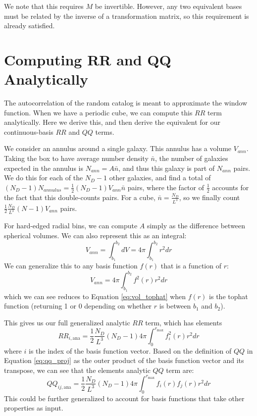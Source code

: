 \documentclass[modern]{aastex62}
\begin{document}
We note that this requires $M$ be invertible.
However, any two equivalent bases must be related by the inverse of a transformation matrix, so this requirement is already satisfied.


\section{Computing RR and QQ Analytically}\label{sec:analytic}

The autocorrelation of the random catalog is meant to approximate the window function. 
When we have a periodic cube, we can compute this $RR$ term analytically.
Here we derive this, and then derive the equivalent for our continuous-basis $RR$ and $QQ$ terms.

We consider an annulus around a single galaxy. 
This annulus has a volume $V_{ann}$.
Taking the box to have average number density $\bar{n}$, the number of galaxies expected in the annulus is $N_{ann} = A \bar{n}$, and thus this galaxy is part of $N_{ann}$ pairs.   
We do this for each of the $N_D-1$ other galaxies, and find a total of $(N_D-1) N_{annulus} = \frac{1}{2} (N_D-1) V_{ann} \bar{n}$ pairs, where the factor of $\frac{1}{2}$ accounts for the fact that this double-counts pairs.
For a cube, $\bar{n} = \frac{N_D}{L^3}$, so we finally count $\frac{1}{2} \frac{N_D}{L^3} (N-1) V_{ann}$ pairs.

For hard-edged radial bins, we can compute $A$ simply as the difference between spherical volumes. 
We can also represent this as an integral:
\begin{equation} \label{eq:vol_tophat}
V_{ann} = \int_{b_1}^{b_2} dV = 4\pi \int_{b_1}^{b_2} r^2 dr
\end{equation} 
We can generalize this to any basis function $f(r)$ that is a function of $r$:
\begin{equation}
V_{ann} = 4\pi  \int_{b_1}^{b_2} f^2(r) r^2 dr
\end{equation}
which we can see reduces to Equation \ref{eq:vol_tophat} when $f(r)$ is the tophat function (returning 1 or 0 depending on whether $r$ is between $b_1$ and $b_2$).

This gives us our full generalized analytic $RR$ term, which has elements
\begin{equation}
RR_{i,\text{ana}} = \frac{1}{2} \frac{N_D}{L^3} (N_D-1)  4\pi  \int_{0}^{r_\mathrm{max}} f_i^2(r) r^2 dr
\end{equation}
where $i$ is the index of the basis function vector.
Based on the definition of $QQ$ in Equation \ref{eq:qq_proj} as the outer product of the basis function vector and its transpose, we can see that the elements analytic $QQ$ term are:
\begin{equation}
QQ_{ij,\text{ana}} = \frac{1}{2} \frac{N_D}{L^3} (N_D-1)  4\pi  \int_{0}^{r_\mathrm{max}} f_i(r) f_j(r) r^2 dr
\end{equation}
This could be further generalized to account for basis functions that take other properties as input.
\end{document}
